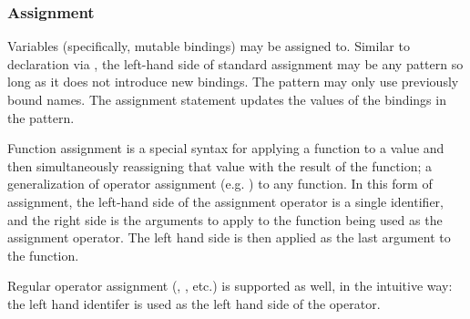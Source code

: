 \subsubsection{Assignment}

Variables (specifically, mutable bindings) may be assigned to. Similar to
declaration via , the left-hand side of standard assignment may be
any pattern so long as it does not introduce new bindings. The pattern may only
use previously bound names. The assignment statement updates the values of the
bindings in the pattern.

Function assignment is a special syntax for applying a function to a value and
then simultaneously reassigning that value with the result of the function; a
generalization of operator assignment (e.g. \op{+=}) to any function. In this form
of assignment, the left-hand side of the assignment operator is a single identifier,
and the right side is the arguments to apply to the function being used as the
assignment operator. The left hand side is then applied as the last argument to
the function.

Regular operator assignment (\op{+=}, \op{-=}, etc.) is supported as well, in the
intuitive way: the left hand identifer is used as the left hand side of the operator.

\begin{bnf*}
     \\
     \\
     \\
     \\
     \\
     \\
    \bnfmore{
        \bnfts{|=}\bnfor
        \bnfts{\&=}\bnfor
        \bnfts{\textasciicircum=}\bnfor
        \bnfts{\textasciitilde=}\bnfor
        \bnfts{<\textasciitilde=}\bnfor
        \bnfts{\textasciitilde>=}
    }
\end{bnf*}

